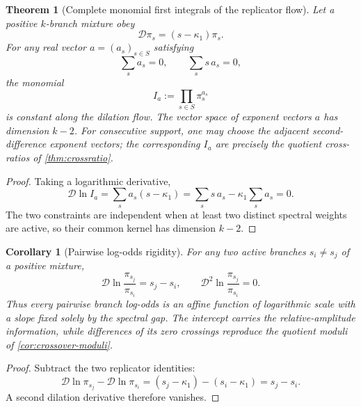 \documentclass[aps,prd,reprint,onecolumn,nofootinbib,superscriptaddress,showkeys]{revtex4-2}
\numberwithin{equation}{section}
\theoremstyle{definition}
\theoremstyle{plain}
\newtheorem{theorem}{Theorem}[section]
\newtheorem{corollary}{Corollary}[section]
\newcommand{\Dil}{\mathscr D}
\begin{document}
\begin{theorem}[Complete monomial first integrals of the replicator flow]\label{thm:replicator-integrals}
Let a positive $k$-branch mixture obey
\[
\Dil\pi_s=(s-\kappa_1)\pi_s.
\]
For any real vector $a=(a_s)_{s\in S}$ satisfying
\begin{equation}
\sum_s a_s=0,
\qquad
\sum_s s\,a_s=0,
\end{equation}
the monomial
\begin{equation}
\boxed{
I_a:=\prod_{s\in S}\pi_s^{a_s}
}
\end{equation}
is constant along the dilation flow.  The vector space of exponent vectors $a$ has dimension $k-2$.  For consecutive support, one may choose the adjacent second-difference exponent vectors; the corresponding $I_a$ are precisely the quotient cross-ratios of \cref{thm:crossratio}.
\end{theorem}

\begin{proof}
Taking a logarithmic derivative,
\[
\Dil\ln I_a
=
\sum_s a_s(s-\kappa_1)
=
\sum_s s\,a_s-\kappa_1\sum_s a_s=0.
\]
The two constraints are independent when at least two distinct spectral weights are active, so their common kernel has dimension $k-2$.
\end{proof}

\begin{corollary}[Pairwise log-odds rigidity]\label{cor:logodds}
For any two active branches $s_i\ne s_j$ of a positive mixture,
\begin{equation}
\boxed{
\Dil\ln\frac{\pi_{s_j}}{\pi_{s_i}}=s_j-s_i,
\qquad
\Dil^2\ln\frac{\pi_{s_j}}{\pi_{s_i}}=0.
}
\end{equation}
Thus every pairwise branch log-odds is an affine function of logarithmic scale with a slope fixed solely by the spectral gap.  The intercept carries the relative-amplitude information, while differences of its zero crossings reproduce the quotient moduli of \cref{cor:crossover-moduli}.
\end{corollary}

\begin{proof}
Subtract the two replicator identities:
\[
\Dil\ln\pi_{s_j}-\Dil\ln\pi_{s_i}
=(s_j-\kappa_1)-(s_i-\kappa_1)=s_j-s_i.
\]
A second dilation derivative therefore vanishes.
\end{proof}
\end{document}
